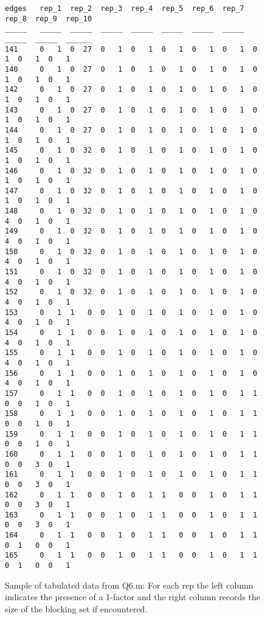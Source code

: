 \documentclass[a4paper]{article}
\begin{document}
\begin{figure}[H]
    \centering
    \begin{verbatim}
edges   rep_1  rep_2  rep_3  rep_4  rep_5  rep_6  rep_7  rep_8  rep_9  rep_10
_____   _____  _____  _____  _____  _____  _____  _____  _____  _____  ______
141     0   1  0  27  0   1  0   1  0   1  0   1  0   1  0   1  0   1  0   1
140     0   1  0  27  0   1  0   1  0   1  0   1  0   1  0   1  0   1  0   1
142     0   1  0  27  0   1  0   1  0   1  0   1  0   1  0   1  0   1  0   1
143     0   1  0  27  0   1  0   1  0   1  0   1  0   1  0   1  0   1  0   1
144     0   1  0  27  0   1  0   1  0   1  0   1  0   1  0   1  0   1  0   1
145     0   1  0  32  0   1  0   1  0   1  0   1  0   1  0   1  0   1  0   1
146     0   1  0  32  0   1  0   1  0   1  0   1  0   1  0   1  0   1  0   1
147     0   1  0  32  0   1  0   1  0   1  0   1  0   1  0   1  0   1  0   1
148     0   1  0  32  0   1  0   1  0   1  0   1  0   1  0   4  0   1  0   1
149     0   1  0  32  0   1  0   1  0   1  0   1  0   1  0   4  0   1  0   1
150     0   1  0  32  0   1  0   1  0   1  0   1  0   1  0   4  0   1  0   1
151     0   1  0  32  0   1  0   1  0   1  0   1  0   1  0   4  0   1  0   1
152     0   1  0  32  0   1  0   1  0   1  0   1  0   1  0   4  0   1  0   1
153     0   1  1   0  0   1  0   1  0   1  0   1  0   1  0   4  0   1  0   1
154     0   1  1   0  0   1  0   1  0   1  0   1  0   1  0   4  0   1  0   1
155     0   1  1   0  0   1  0   1  0   1  0   1  0   1  0   4  0   1  0   1
156     0   1  1   0  0   1  0   1  0   1  0   1  0   1  0   4  0   1  0   1
157     0   1  1   0  0   1  0   1  0   1  0   1  0   1  1   0  0   1  0   1
158     0   1  1   0  0   1  0   1  0   1  0   1  0   1  1   0  0   1  0   1
159     0   1  1   0  0   1  0   1  0   1  0   1  0   1  1   0  0   1  0   1
160     0   1  1   0  0   1  0   1  0   1  0   1  0   1  1   0  0   3  0   1
161     0   1  1   0  0   1  0   1  0   1  0   1  0   1  1   0  0   3  0   1
162     0   1  1   0  0   1  0   1  1   0  0   1  0   1  1   0  0   3  0   1
163     0   1  1   0  0   1  0   1  1   0  0   1  0   1  1   0  0   3  0   1
164     0   1  1   0  0   1  0   1  1   0  0   1  0   1  1   0  1   0  0   1
165     0   1  1   0  0   1  0   1  1   0  0   1  0   1  1   0  1   0  0   1
    \end{verbatim}
    \caption{Sample of tabulated data from Q6.m: For each rep the left column indicates the presence of a 1-factor and the right column records the size of the blocking set if encountered.}
    \label{fig:q6tab}
\end{figure}
\end{document}
